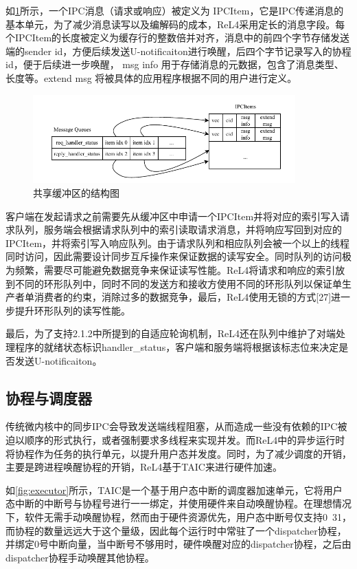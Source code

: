 如\ref{fig:ipcitem}所示，一个IPC消息（请求或响应）被定义为 IPCItem，它是IPC传递消息的基本单元，为了减少消息读写以及编解码的成本，ReL4采用定长的消息字段。每个IPCItem的长度被定义为缓存行的整数倍并对齐，消息中的前四个字节存储发送端的sender id，方便后续发送U-notificaiton进行唤醒，后四个字节记录写入的协程id，便于后续进一步唤醒， msg info 用于存储消息的元数据，包含了消息类型、长度等。extend msg 将被具体的应用程序根据不同的用户进行定义。

\begin{figure}[htbp]
  \centering
  \includegraphics[width=0.9\textwidth]{figures/IPCItem.drawio.pdf}
  \caption{共享缓冲区的结构图}\label{fig:ipcitem}
\end{figure}

客户端在发起请求之前需要先从缓冲区中申请一个IPCItem并将对应的索引写入请求队列，服务端会根据请求队列中的索引读取请求消息，并将响应写回到对应的IPCItem，并将索引写入响应队列。由于请求队列和相应队列会被一个以上的线程同时访问，因此需要设计同步互斥操作来保证数据的读写安全。同时队列的访问极为频繁，需要尽可能避免数据竞争来保证读写性能。ReL4将请求和响应的索引放到不同的环形队列中，同时不同的发送方和接收方使用不同的环形队列以保证单生产者单消费者的约束，消除过多的数据竞争，最后，ReL4使用无锁的方式[27]进一步提升环形队列的读写性能。

最后，为了支持2.1.2中所提到的自适应轮询机制，ReL4还在队列中维护了对端处理程序的就绪状态标识handler\_status，客户端和服务端将根据该标志位来决定是否发送U-notificaiton。

\subsection{协程与调度器}
传统微内核中的同步IPC会导致发送端线程阻塞，从而造成一些没有依赖的IPC被迫以顺序的形式执行，或者强制要求多线程来实现并发。而ReL4中的异步运行时将协程作为任务的执行单元，以提升用户态并发度。同时，为了减少调度的开销，主要是跨进程唤醒协程的开销，ReL4基于TAIC来进行硬件加速。

如\ref{fig:executor}所示，TAIC是一个基于用户态中断的调度器加速单元，它将用户态中断的中断号与协程号进行一一绑定，并使用硬件来自动唤醒协程。在理想情况下，软件无需手动唤醒协程，然而由于硬件资源优先，用户态中断号仅支持0~31，而协程的数量远远大于这个量级，因此每个运行时中常驻了一个dispatcher协程，并绑定0号中断向量，当中断号不够用时，硬件唤醒对应的dispatcher协程，之后由dispatcher协程手动唤醒其他协程。

